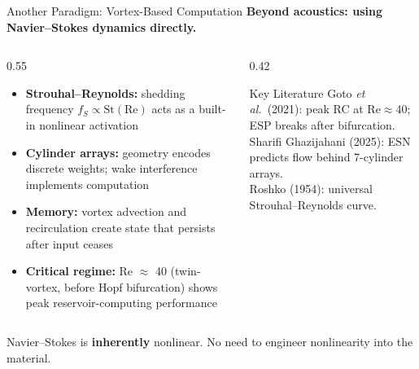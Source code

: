 \documentclass[aspectratio=169,11pt]{beamer}
\begin{document}
\begin{frame}{Another Paradigm: Vortex-Based Computation}
  \textbf{Beyond acoustics: using Navier--Stokes dynamics directly.}

  \vspace{0.2cm}
  \begin{columns}[T]
    \begin{column}{0.55\textwidth}
      \footnotesize
      \begin{itemize}
        \item \textbf{Strouhal--Reynolds:} shedding frequency $f_S \propto \text{St}(\text{Re})$ acts as a built-in nonlinear activation
        \item \textbf{Cylinder arrays:} geometry encodes discrete weights; wake interference implements computation
        \item \textbf{Memory:} vortex advection and recirculation create state that persists after input ceases
        \item \textbf{Critical regime:} Re $\approx$ 40 (twin-vortex, before Hopf bifurcation) shows peak reservoir-computing performance
      \end{itemize}
    \end{column}
    \begin{column}{0.42\textwidth}
      \begin{block}{\footnotesize Key Literature}
        \footnotesize
        Goto \textit{et al.}\ (2021): peak RC at Re$\approx$40; ESP breaks after bifurcation.\\[0.1cm]
        Sharifi Ghazijahani (2025): ESN predicts flow behind 7-cylinder arrays.\\[0.1cm]
        Roshko (1954): universal Strouhal--Reynolds curve.
      \end{block}
    \end{column}
  \end{columns}

  \vspace{0.3cm}
  \textcolor{gdpBurgundy}{\small Navier--Stokes is \textbf{inherently} nonlinear. No need to engineer nonlinearity into the material.}
\end{frame}
\end{document}
